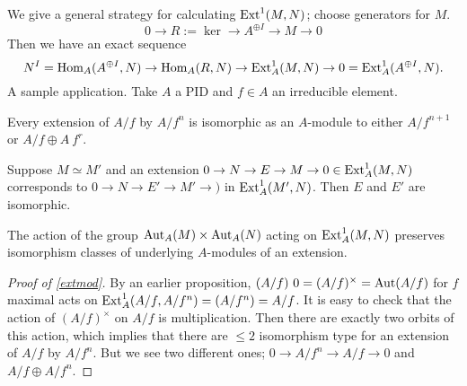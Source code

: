 We give a general strategy for calculating $\operatorname{Ext}^1(M,N)$; choose generators for $M$. \[
0 \to R :=\ker \to A ^{\oplus I}\to M \to 0
\] Then we have an exact sequence \[
N^I = \operatorname{Hom} _A(A ^{\oplus I},N) \to \operatorname{Hom}_A(R,N) \to \operatorname{Ext}^1_A(M,N) \to 0=\operatorname{Ext}_A^1(A ^{\oplus I},N).
\] A sample application. Take $A$ a PID and $f \in A$ an irreducible element. 
\begin{prop}\label{extmod} 
    Every extension of $A /f$ by $A /f ^n $ is isomorphic as an $A$-module to either $A / f ^{n+1}$ or $A /f \oplus A \ f^r$.
\end{prop}
\begin{lemma}
    Suppose $M \simeq  M'$ and an extension $0 \to  N \to E \to M \to 0 \in \operatorname{Ext}_A^1(M,N)$corresponds to $0 \to N \to E' \to M' \to )$ in $\operatorname{Ext}_A^1(M',N)$. Then $E$ and $E'$ are isomorphic. 
\end{lemma}
\begin{cor}
    The action of the group $\mathrm{Aut}_A(M) \times \mathrm{Aut}_A(N)$ acting on $\operatorname{Ext}^1_A(M,N)$ preserves isomorphism classes of underlying $A$-modules of an extension.
\end{cor}
\begin{proof}[Proof of \cref{extmod}]
    By an earlier proposition, $(A / f ) \ 0= (A /f )^{\times }=\mathrm{Aut}(A /f)$ for $f$ maximal acts on $\operatorname{Ext}_A^1(A /f, A / f^n )=(A /f ^n )= A /f$. It is easy to check that the action of $(A /f ) ^{\times }$ on $A /f$ is multiplication. Then there are exactly two orbits of this action, which implies that there are $\leq 2$ isomorphism type for an extension of $A /f$ by $A /f ^n $. But we see two different ones; $0 \to A /f^n  \to A /f \to 0$ and $A /f \oplus A / f^n .$
\end{proof}
